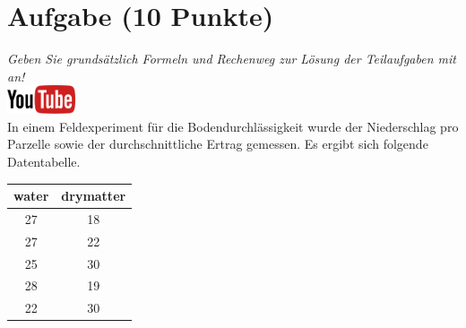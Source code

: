 \documentclass[a4paper, 10pt]{scrartcl}\usepackage[]{graphicx}\usepackage[]{xcolor}
\begin{document}
\section{Aufgabe \hfill (10 Punkte)}

\textit{Geben Sie grunds{\"a}tzlich Formeln und Rechenweg zur L{\"o}sung der
  Teilaufgaben mit an!} \\[1Ex]

\hfill\href{https://youtu.be/VAqiUdV4WQ0}{\includegraphics[width =
  2cm]{img/youtube}}\\[1Ex]

In einem Feldexperiment f{\"u}r die Bodendurchl{\"a}ssigkeit wurde der Niederschlag
pro Parzelle sowie der durchschnittliche Ertrag gemessen. Es ergibt sich
folgende Datentabelle. 

\begin{table}[!h]
\centering
\begin{tabular}{cc}
\toprule
water & drymatter\\
\midrule
27 & 18\\
27 & 22\\
25 & 30\\
28 & 19\\
22 & 30\\
\bottomrule
\end{tabular}
\end{table}
\end{document}
